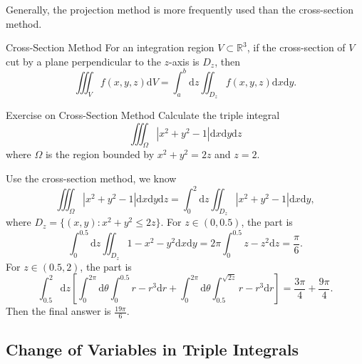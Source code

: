 \begin{note}
  Generally, the projection method is more frequently used than the
  cross-section method.
\end{note}

\begin{proposition}{Cross-Section Method}{}
  For an integration region $V \subset \mathbb{R}^3$,
  if the cross-section of $V$ cut by a plane perpendicular
  to the $z$-axis is $D_z$, then
  \begin{equation}
    \iiint _Vf(x,y,z) \mathrm{d}V = \int ^b_a \mathrm{d}z \iint _{D_z}f(x,y,z)\mathrm{d}x\mathrm{d}y.
  \end{equation}
\end{proposition}

\begin{example}{Exercise on Cross-Section Method}{}
  Calculate the triple integral
  \begin{equation}
    \iiint_{\Omega} |x^2 + y^2 - 1|\mathrm{d} x \mathrm{d} y \mathrm{d} z
  \end{equation}
  where $\Omega$ is the region bounded by $x^2 + y^2 = 2z$ and $z = 2$.
\end{example}

\begin{solution}
  Use the cross-section method, we know
  \begin{equation}
    \iiint_{\Omega} |x^2 + y^2 - 1| \mathrm{d} x \mathrm{d} y \mathrm{d} z
    = \int_0^2 \mathrm{d} z \iint_{D_z} |x^2 + y^2 - 1|\mathrm{d} x \mathrm{d} y,
  \end{equation}
  where $D_z = \{(x, y): x^2 + y^2 \leq 2z\}$.
  For $z \in (0, 0.5)$, the part is
  \begin{equation}
    \int_0^{0.5} \mathrm{d} z \iint_{D_z} 1 - x^2 - y^2 \mathrm{d} x \mathrm{d} y
    = 2\pi \int_0^{0.5} z - z^2 \mathrm{d} z = \frac{\pi}{6}.
  \end{equation}
  For $z \in (0.5, 2)$, the part is
  \begin{equation}
    \int_{0.5}^2 \mathrm{d} z
    \left[
      \int_0^{2\pi} \mathrm{d} \theta \int_0^{0.5} r - r^3\mathrm{d} r
      + \int_0^{2\pi} \mathrm{d} \theta \int_{0.5}^{\sqrt{2z}} r - r^3\mathrm{d} r
    \right]= \frac{3\pi}{4} + \frac{9\pi}{4}.
  \end{equation}
  Then the final answer is $\frac{19\pi}{6}$.
\end{solution}

\subsection{Change of Variables in Triple Integrals}

